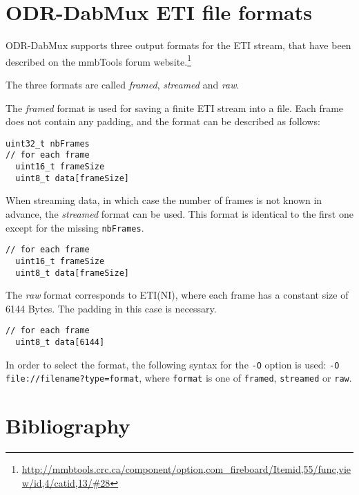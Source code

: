 
\section{ODR-DabMux ETI file formats}
\label{etiformat}
ODR-DabMux supports three output formats for the ETI stream, that have been described on the mmbTools forum
website.\footnote{\url{http://mmbtools.crc.ca/component/option,com\_fireboard/Itemid,55/func,view/id,4/catid,13/\#28}}

The three formats are called \emph{framed}, \emph{streamed} and \emph{raw}.

The \emph{framed} format is used for saving a finite ETI stream into a file. Each frame does not contain any padding, and the
format can be described as follows:
\begin{lstlisting}
uint32_t nbFrames
// for each frame
  uint16_t frameSize
  uint8_t data[frameSize]
\end{lstlisting}

When streaming data, in which case the number of frames is not known in advance, the \emph{streamed} format can be used.
This format is identical to the first one except for the missing \texttt{nbFrames}.
\begin{lstlisting}
// for each frame
  uint16_t frameSize
  uint8_t data[frameSize]
\end{lstlisting}

The \emph{raw} format corresponds to ETI(NI), where each frame has a constant size of 6144 Bytes. The padding in this
case is necessary.
\begin{lstlisting}
// for each frame
  uint8_t data[6144]
\end{lstlisting}

In order to select the format, the following syntax for the \texttt{-O} option is used:
\texttt{-O file://filename?type=format}, where \texttt{format} is one of \verb+framed+, \verb+streamed+ or
\verb+raw+.

\section{Bibliography}



